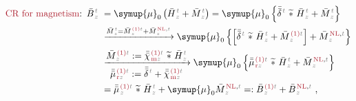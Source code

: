 \begin{subequations} \label{eq:cr-b}
\begin{align}
	\textcolor{Maroon}{\text{CR for magnetism}}\text{:}&\hspace{0.5em} \bar{B}^{\;\!\mathcolor{gray}{t}}_{\;\!\mathcolor{gray}{z}} \hspace{-0.7em} &&={\symup{\mu}}_0 \left( \bar{H}^{\;\!\mathcolor{gray}{t}}_{\;\!\mathcolor{gray}{z}} + \bar{M}^{\;\!\mathcolor{gray}{t}}_{\;\!\mathcolor{gray}{z}} \right) = {\symup{\mu}}_0 \left\{ \bar{\bar{\delta}}^{\;\!\mathcolor{gray}{t}}~\widetilde *~\bar{H}^{\;\!\mathcolor{gray}{t}}_{\;\!\mathcolor{gray}{z}} + \bar{M}^{\;\!\mathcolor{gray}{t}}_{\;\!\mathcolor{gray}{z}} \right\} \label{cr-b1} \\ 
	& &&\xrightarrow[]{\bar{M}^{\;\!\mathcolor{gray}{t}}_{\;\!\mathcolor{gray}{z}} = \bar{M}^{\;\!\textcolor{Maroon}{\text{(1)}} \mathcolor{gray}{t}}_{\;\!\mathcolor{gray}{z}} + \bar{M}^{\;\!\textcolor{Maroon}{\text{NL}}, \mathcolor{gray}{t}}_{\;\!\mathcolor{gray}{z}}} {\symup{\mu}}_0 \left\{ \left[ \bar{\bar{\delta}}^{\;\!\mathcolor{gray}{t}}~\widetilde *~\bar{H}^{\;\!\mathcolor{gray}{t}}_{\;\!\mathcolor{gray}{z}} + \bar{M}^{\;\!\textcolor{Maroon}{\text{(1)}} \mathcolor{gray}{t}}_{\;\!\mathcolor{gray}{z}} \right] + \bar{M}^{\;\!\textcolor{Maroon}{\text{NL}}, \mathcolor{gray}{t}}_{\;\!\mathcolor{gray}{z}} \right\} \label{cr-b2} \\ 
	& &&\xrightarrow[\displaystyle{ \bar{\bar{\mu}}^{\;\!\textcolor{Maroon}{\text{(1)}} \mathcolor{gray}{t}}_{\;\!\textcolor{Maroon}{\text{r}}\mathcolor{gray}{z}} := \bar{\bar{\delta}}^{\;\!\mathcolor{gray}{t}} + \bar{\bar{\chi}}^{\;\!\textcolor{Maroon}{\text{(1)}}\mathcolor{gray}{t}}_{\;\!\textcolor{Maroon}{\text{m}} \mathcolor{gray}{z}}}]{\displaystyle{\bar{M}^{\;\!\textcolor{Maroon}{\text{(1)}} \mathcolor{gray}{t}}_{\;\!\mathcolor{gray}{z}} := \bar{\bar{\chi}}^{\;\!\textcolor{Maroon}{\text{(1)}}\mathcolor{gray}{t}}_{\;\!\textcolor{Maroon}{\text{m}} \mathcolor{gray}{z}} ~\widetilde *~\bar{H}^{\;\!\mathcolor{gray}{t}}_{\;\!\mathcolor{gray}{z}}}} {\symup{\mu}}_0 \left\{ \bar{\bar{\mu}}^{\;\!\textcolor{Maroon}{\text{(1)}} \mathcolor{gray}{t}}_{\;\!\textcolor{Maroon}{\text{r}}\mathcolor{gray}{z}}~\widetilde *~\bar{H}^{\;\!\mathcolor{gray}{t}}_{\;\!\mathcolor{gray}{z}} + \bar{M}^{\;\!\textcolor{Maroon}{\text{NL}}, \mathcolor{gray}{t}}_{\;\!\mathcolor{gray}{z}} \right\} \label{cr-b3} \\ 
	& &&= \bar{\bar{\mu}}^{\;\!\textcolor{Maroon}{\text{(1)}} \mathcolor{gray}{t}}_{\;\!\mathcolor{gray}{z}}~\widetilde *~\bar{H}^{\;\!\mathcolor{gray}{t}}_{\;\!\mathcolor{gray}{z}} + {\symup{\mu}}_0 \bar{M}^{\;\!\textcolor{Maroon}{\text{NL}}, \mathcolor{gray}{t}}_{\;\!\mathcolor{gray}{z}} =: \bar{B}^{\;\!\textcolor{Maroon}{\text{(1)}} \mathcolor{gray}{t}}_{\;\!\mathcolor{gray}{z}} + \bar{B}^{\;\!\textcolor{Maroon}{\text{NL}}, \mathcolor{gray}{t}}_{\;\!\mathcolor{gray}{z}}~, \label{cr-b4}
\end{align}
\end{subequations}
